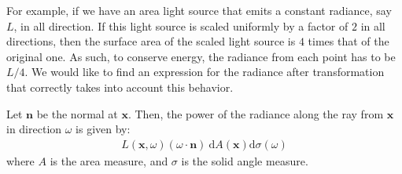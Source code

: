 \documentclass[10pt]{article}
\newcommand{\dee}{\mathrm{d}}
\newcommand{\ve}[1]{\mathbf{#1}}
\begin{document}
  For example, if we have an area light source that emits a constant radiance, say $L$, in all direction.  If this light source is scaled uniformly by a factor of $2$ in all directions, then the surface area of the scaled light source is $4$ times that of the original one.  As such, to conserve energy, the radiance from each point has to be $L/4$.  We would like to find an expression for the radiance after transformation that correctly takes into account this behavior.

  Let $\ve{n}$ be the normal at $\ve{x}$.  Then, the power of the radiance along the ray from $\ve{x}$ in direction $\omega$ is given by:
  \begin{align*}
    L(\ve{x}, \omega) (\omega \cdot \ve{n})\ \dee A(\ve{x}) \dee\sigma(\omega)
  \end{align*}
  where $A$ is the area measure, and $\sigma$ is the solid angle measure.
\end{document}
